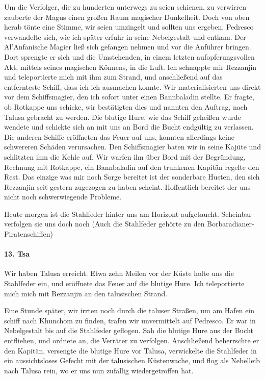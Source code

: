 Um die Verfolger, die zu hunderten unterwegs zu seien schienen, zu verwirren zauberte der Magus einen großen Raum magischer Dunkelheit. Doch von oben herab tönte eine Stimme, wir seien umzingelt und sollten uns ergeben. Pedresco verwandelte sich, wie ich später erfuhr in seine Nebelgestalt und entkam. Der Al'Anfanische Magier ließ sich gefangen nehmen und vor die Anführer bringen. Dort sprengte er sich und die Umstehenden, in einem letzten aufopferungsvollen Akt, mittels seines magischen Könnens, in die Luft. Ich schnappte mir Rezzanjin und teleportierte mich mit ihm zum Strand, und anschließend auf das entfernteste Schiff, dass ich ich ausmachen konnte. Wir materialisierten uns direkt vor dem Schiffsmagier, den ich sofort unter einen Bannbaladin stellte. Er fragte, ob Rotkappe uns schicke, wir bestätigten dies und nannten den Auftrag, nach Talusa gebracht zu werden. Die blutige Hure, wie das Schiff geheißen wurde wendete und schickte sich an mit uns an Bord die Bucht endgültig zu verlassen. Die anderen Schiffe eröffneten das Feuer auf uns, konnten allerdings keine schwereren Schäden verursachen. Den Schiffsmagier baten wir in seine Kajüte und schlitzten ihm die Kehle auf. Wir warfen ihn über Bord mit der Begründung, Rechnung mit Rotkappe, ein Bannbaladin auf den trunkenen Kapitän regelte den Rest. Das einzige was mir noch Sorge bereitet ist der sonderbare Husten, den sich Rezzanjin seit gestern zugezogen zu haben scheint. Hoffentlich bereitet der uns nicht noch schwerwiegende Probleme.

Heute morgen ist die Stahlfeder hinter uns am Horizont aufgetaucht. Scheinbar verfolgen sie uns doch noch (Auch die Stahlfeder gehörte zu den Borbaradianer-Piratenschiffen)

\paragraph{13. Tsa}
Wir haben Talusa erreicht. Etwa zehn Meilen vor der Küste holte uns die Stahlfeder ein, und eröffnete das Feuer auf die blutige Hure. Ich teleportierte mich mich mit Rezzanjin an den talusischen Strand.

Eine Stunde später, wir irrten noch durch die taluser Straßen, um am Hafen ein schiff nach Khunchom zu finden, trafen wir unvermittelt auf Pedresco. Er war in Nebelgestalt bis auf die Stahlfeder geflogen. Sah die blutige Hure aus der Bucht entfliehen, und ordnete an, die Verräter zu verfolgen. Anschließend beherrschte er den Kapitän, versengte die blutige Hure vor Talusa, verwickelte die Stahlfeder in ein aussichtsloses Gefecht mit der talusischen Küstenwache, und flog als Nebelleib nach Talusa rein, wo er uns nun zufällig wiedergetroffen hat.

